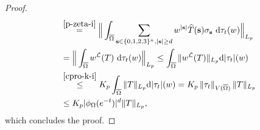 \documentclass{amsbook}
\theoremstyle{definition}
\theoremstyle{remark}
\numberwithin{section}{chapter}
\numberwithin{equation}{chapter}
\newcommand{\1}{\mathbf{1}}
\begin{document}
\begin{proof}
\begin{align*}
&\stackrel{\eqref{p-zeta-i}}{=}\Big\|\int_{\overline{\Omega}}\sum_{\mathbf{s}\in\{0,1,2,3\}^n,|\mathbf{s}|\geq d}w^{|\mathbf{s}|}\widehat{T}(\mathbf{s}) \sigma_{\mathbf{s}}\mathrm{~d}\tau_t(w)\Big\|_{L_{p}}\\
&=\Big\|\int_{\overline{\Omega}} w^{\mathcal{L}}(T) \mathrm{~d}\tau_{t}(w)\Big\|_{L_{p}} \leq \int_{\overline{\Omega}}\|w^{\mathcal{L}} (T)\|_{L_{p}} \mathrm{d}|\tau_{t}|(w) \\
& \stackrel{\eqref{cpro-k-i}}{\leq} K_p \int_{\overline{\Omega}}\|T\|_{L_{p}} \mathrm{d}|\tau_{t}|(w)=K_p\left\|\tau_{t}\right\|_{V(\overline{\Omega})}\|T\|_{L_{p}} \\
& \leq K_p |\phi_{\Omega}(e^{-t})|^{d}\|T\|_{L_{p}},
\end{align*}
which concludes the proof.
\end{proof}
\end{document}
